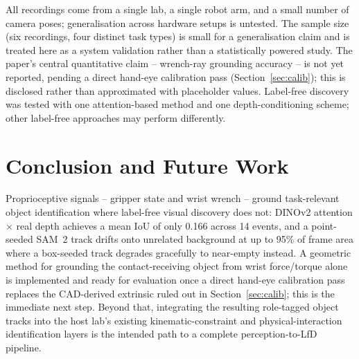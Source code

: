 \documentclass[letterpaper, 10pt, journal, twoside]{IEEEtran}
\begin{document}
All recordings come from a single lab, a single robot arm, and a small
number of camera poses; generalisation across hardware setups is
untested. The sample size (six recordings, four distinct task types) is small for a
generalisation claim and is treated here as a system validation rather
than a statistically powered study. The paper's central quantitative
claim -- wrench-ray grounding accuracy -- is not yet reported, pending
a direct hand-eye calibration pass (Section~\ref{sec:calib}); this is
disclosed rather than approximated with placeholder values. Label-free
discovery was tested with one
attention-based method and one depth-conditioning scheme; other label-free
approaches may perform differently.

\section{Conclusion and Future Work}

Proprioceptive signals -- gripper state and wrist wrench -- ground
task-relevant object identification where label-free visual discovery
does not: DINOv2 attention $\times$ real depth achieves a mean IoU of
only 0.166 across 14 events, and a point-seeded SAM~2 track drifts onto
unrelated background at up to 95\% of frame area where a box-seeded
track degrades gracefully to near-empty instead. A geometric method for
grounding the contact-receiving object from wrist force/torque alone is
implemented and ready for evaluation once a direct hand-eye calibration
pass replaces the CAD-derived extrinsic ruled out in
Section~\ref{sec:calib}; this is the immediate next step. Beyond that,
integrating the resulting role-tagged object tracks into the host lab's
existing kinematic-constraint and physical-interaction identification
layers \cite{overbeek2025frontiers,overbeek2025adrr} is the intended path
to a complete perception-to-LfD pipeline.
\end{document}
